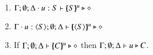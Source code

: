 



\begin{proposition}\rm
\label{pro:characteristic}
\begin{enumerate}
\item $\Gamma; \emptyset; \Delta \cdot u:S \vdash [\!\!(S)\!\!]^{u} \triangleright \diamond$ 
\item $\Gamma \cdot u:\langle S \rangle; \emptyset; \Delta \vdash [\!\!(\langle S \rangle)\!\!]^{u} \triangleright \diamond$
\item 	If $\Gamma; \emptyset; \Delta \vdash [\!\!(C)\!\!]^{u} \triangleright \diamond$
	then
	$\Gamma; \emptyset; \Delta \vdash u \triangleright C$.
\end{enumerate}
\end{proposition}

